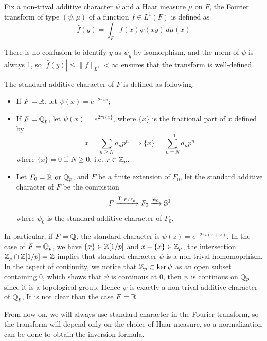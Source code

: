 \begin{definition}
    Fix a non-trival additive character \(\psi\) and a Haar measure \(\mu\) on \(F\), the Fourier transform of type \((\psi, \mu)\) of a function \(f \in L^1(F)\) is defined as
    \[\hat{f}(y) = \int_F f(x) \psi(xy) \, d\mu(x)\]
\end{definition}

There is no confusion to identify \(y\) as \(\psi_y\) by isomorphism, and the norm of \(\psi\) is always 1, so \(|\hat{f}(y)| \leq \|f\|_{L^1} < \infty \) ensures that the transform is well-defined.

\begin{definition} \label{standardcharacter}
    The standard additive character of \(F\) is defined as following:
    \begin{itemize}
        \item If \(F = \mathbb{R}\), let \(\psi(x) = e^{-2\pi i x}\);
        \item If \(F = \mathbb{Q}_p\), let \(\psi(x) = e^{2\pi i \{x\}}\), where \(\{x\}\) is the fractional part of \(x\) defined by
        \[x = \sum_{n \geq N} a_np^n \implies \{x\} = \sum_{n = N}^{-1} a_np^n\]
        where \(\{x\} = 0\) if \(N \geq 0\), i.e. \(x \in \mathbb{Z}_p\).
        \item Let \(F_0 = \mathbb{R} \text{ or } \mathbb{Q}_p\), and \(F\) be a finite extension of \(F_0\), let the standard additive character of \(F\) be the compistion 
        \[F \xrightarrow{\mathrm{Tr}_{F/F_0}} F_0 \xrightarrow{\psi_0} \mathbb{S}^1\]
        where \(\psi_0\) is the standard additive character of \(F_0\).
    \end{itemize}
\end{definition}

In particular, if \(F =\mathbb{Q}\), the standard character is \(\psi(z) = e^{-2 \pi i(z + \bar{z})}\). In the case of \(F =\mathbb{Q}_p\), we have \(\{x\} \in \mathbb{Z}[1/p]\) and \(x - \{x\} \in \mathbb{Z}_p\), the intersection \(\mathbb{Z}_p \cap \mathbb{Z}[1/p] = \mathbb{Z}\) implies that standard character \(\psi\) is a non-trival homomoprhism. In the aspect of continuity, we notice that \(\mathbb{Z}_p \subset \ker \psi\) as an open subset containing \(0\), which shows that \(\psi\) is continous at \(0\), then \(\psi\) is continous on \(\mathbb{Q}_p\) since it is a topological group. Hence \(\psi\) is exactly a non-trival additive character of \(\mathbb{Q}_p\), It is not clear than the case \(F =\mathbb{R}\).

From now on, we will always use standard character in the Fourier transform, so the transform will depend only on the choice of Haar measure, so a normalization can be done to obtain the inversion formula.

